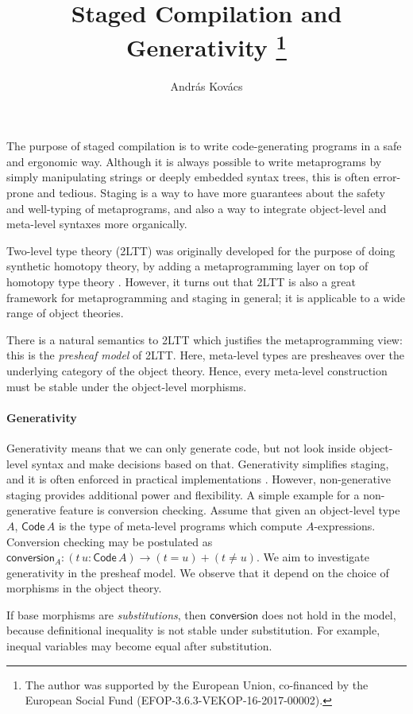 \documentclass{easychair}
\title{Staged Compilation and Generativity%
  \thanks{The author was supported by the European Union, co-financed
    by the European Social Fund (EFOP-3.6.3-VEKOP-16-2017-00002).}}
\author{
Andr\'as Kov\'acs
}
\institute{
  E\"otv\"os Lor\'and University,
  Budapest, Hungary \\
  \email{kovacsandras@inf.elte.hu}
}
\newcommand{\ms}[1]{\mathsf{#1}}
\newcommand{\Code}{\mathsf{Code}}
\begin{document}
\maketitle

The purpose of staged compilation is to write code-generating programs in a safe
and ergonomic way. Although it is always possible to write metaprograms by
simply manipulating strings or deeply embedded syntax trees, this is often
error-prone and tedious. Staging is a way to have more guarantees about the
safety and well-typing of metaprograms, and also a way to integrate object-level
and meta-level syntaxes more organically.

Two-level type theory (2LTT) \cite{twolevel} was originally developed for the
purpose of doing synthetic homotopy theory, by adding a metaprogramming layer on
top of homotopy type theory \cite{hottbook}. However, it turns out that 2LTT is
also a great framework for metaprogramming and staging in general; it is
applicable to a wide range of object theories.

There is a natural semantics to 2LTT which justifies the metaprogramming view:
this is the \emph{presheaf model} of 2LTT. Here, meta-level types are presheaves
over the underlying category of the object theory. Hence, every meta-level
construction must be stable under the object-level morphisms.

\paragraph{Generativity}Generativity means that we can only generate code, but not look inside
object-level syntax and make decisions based on that. Generativity simplifies
staging, and it is often enforced in practical implementations
\cite{kiselyov14metaocaml}. However, non-generative staging provides additional
power and flexibility. A simple example for a non-generative feature is
conversion checking. Assume that given an object-level type $A$, $\Code\,A$ is
the type of meta-level programs which compute $A$-expressions. Conversion
checking may be postulated as $\ms{conversion}_A : (t\,u : \Code\,A) \to (t = u)
+ (t \neq u)$. We aim to investigate generativity in the presheaf model. We
observe that it depend on the choice of morphisms in the object theory.

If base morphisms are \emph{substitutions}, then $\ms{conversion}$ does not hold
in the model, because definitional inequality is not stable under substitution. For
example, inequal variables may become equal after substitution.
\end{document}

